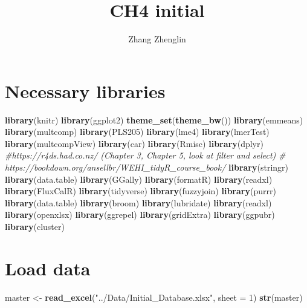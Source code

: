 \documentclass[
]{article}
\title{CH4 initial}
\author{Zhang Zhenglin}
\date{}
\newenvironment{Shaded}{\begin{snugshade}}{\end{snugshade}}
\newcommand{\AttributeTok}[1]{\textcolor[rgb]{0.13,0.29,0.53}{#1}}
\newcommand{\CommentTok}[1]{\textcolor[rgb]{0.56,0.35,0.01}{\textit{#1}}}
\newcommand{\DecValTok}[1]{\textcolor[rgb]{0.00,0.00,0.81}{#1}}
\newcommand{\FunctionTok}[1]{\textcolor[rgb]{0.13,0.29,0.53}{\textbf{#1}}}
\newcommand{\NormalTok}[1]{#1}
\newcommand{\OtherTok}[1]{\textcolor[rgb]{0.56,0.35,0.01}{#1}}
\newcommand{\StringTok}[1]{\textcolor[rgb]{0.31,0.60,0.02}{#1}}
\begin{document}
\maketitle

{
\setcounter{tocdepth}{2}
\tableofcontents
}
\section{Necessary libraries}\label{necessary-libraries}

\begin{Shaded}
\begin{Highlighting}[]
\FunctionTok{library}\NormalTok{(knitr)}
\FunctionTok{library}\NormalTok{(ggplot2)}
\FunctionTok{theme\_set}\NormalTok{(}\FunctionTok{theme\_bw}\NormalTok{())}
\FunctionTok{library}\NormalTok{(emmeans)}
\FunctionTok{library}\NormalTok{(multcomp)}
\FunctionTok{library}\NormalTok{(PLS205)}
\FunctionTok{library}\NormalTok{(lme4)}
\FunctionTok{library}\NormalTok{(lmerTest)}
\FunctionTok{library}\NormalTok{(multcompView)}
\FunctionTok{library}\NormalTok{(car)}
\FunctionTok{library}\NormalTok{(Rmisc) }
\FunctionTok{library}\NormalTok{(dplyr) }\CommentTok{\#https://r4ds.had.co.nz/ (Chapter 3, Chapter 5, look at filter and select)}
\CommentTok{\# https://bookdown.org/ansellbr/WEHI\_tidyR\_course\_book/}
\FunctionTok{library}\NormalTok{(stringr) }
\FunctionTok{library}\NormalTok{(data.table)}
\FunctionTok{library}\NormalTok{(GGally)}
\FunctionTok{library}\NormalTok{(formatR)}
\FunctionTok{library}\NormalTok{(readxl)}
\FunctionTok{library}\NormalTok{(FluxCalR)}
\FunctionTok{library}\NormalTok{(tidyverse)}
\FunctionTok{library}\NormalTok{(fuzzyjoin)}
\FunctionTok{library}\NormalTok{(purrr)}
\FunctionTok{library}\NormalTok{(data.table)}
\FunctionTok{library}\NormalTok{(broom)}
\FunctionTok{library}\NormalTok{(lubridate)}
\FunctionTok{library}\NormalTok{(readxl)}
\FunctionTok{library}\NormalTok{(openxlsx)}
\FunctionTok{library}\NormalTok{(ggrepel)}
\FunctionTok{library}\NormalTok{(gridExtra)}
\FunctionTok{library}\NormalTok{(ggpubr)}
\FunctionTok{library}\NormalTok{(cluster)}
\end{Highlighting}
\end{Shaded}

\section{Load data}\label{load-data}

\begin{Shaded}
\begin{Highlighting}[]
\NormalTok{master }\OtherTok{\textless{}{-}} \FunctionTok{read\_excel}\NormalTok{(}\StringTok{"../Data/Initial\_Database.xlsx"}\NormalTok{, }\AttributeTok{sheet =} \DecValTok{1}\NormalTok{)}
\FunctionTok{str}\NormalTok{(master)}
\end{Highlighting}
\end{Shaded}
\end{document}
